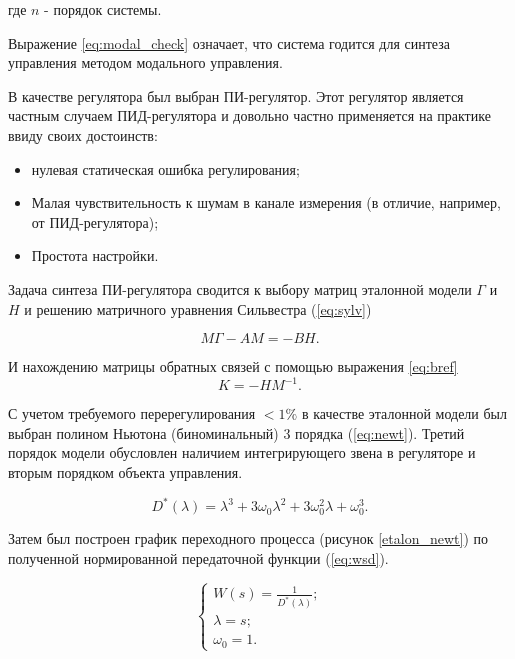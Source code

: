 где $n$ - порядок системы.

Выражение \ref{eq:modal_check} означает, что система годится для синтеза управления методом
модального управления.

В качестве регулятора был выбран ПИ-регулятор. Этот регулятор является частным случаем ПИД-регулятора
и довольно частно применяется на практике ввиду своих достоинств:

\begin{itemize}
  \item нулевая статическая ошибка регулирования;
  \item Малая чувствительность к шумам в канале измерения (в отличие, например, от ПИД-регулятора);
  \item Простота настройки.
\end{itemize}

Задача синтеза ПИ-регулятора сводится к выбору матриц эталонной модели $\Gamma$ и $H$ и 
решению матричного уравнения Сильвестра (\ref{eq:sylv}) \cite{МодальноеУправление}

\begin{equation}
  M\Gamma-AM=-BH.
  \label{eq:sylv}
\end{equation}

И нахождению матрицы обратных связей с помощью выражения \ref{eq:bref}
\begin{equation}
  K = -HM^{-1}.
  \label{eq:bref}
\end{equation}

С учетом требуемого перерегулирования $<1\%$ в качестве эталонной модели был выбран 
полином Ньютона (биноминальный) 3 порядка (\ref{eq:newt}). Третий порядок
модели обусловлен наличием интегрирующего звена в регуляторе и вторым порядком
объекта управления.

\begin{equation}
  D^{\text{*}}(\lambda)=\lambda^3+3\omega_0\lambda^2+3\omega_0^2\lambda+\omega_0^3.
  \label{eq:newt}
\end{equation}

Затем был построен график переходного процесса (рисунок \ref{etalon_newt}) по полученной нормированной 
передаточной функции (\ref{eq:wsd}).

\begin{equation}
  \begin{cases}
    W(s)=\frac{1}{D^{\text{*}}(\lambda)};
    \\
    \lambda=s;
    \\
    \omega_0=1.
  \end{cases}
  \label{eq:wsd}
\end{equation}

